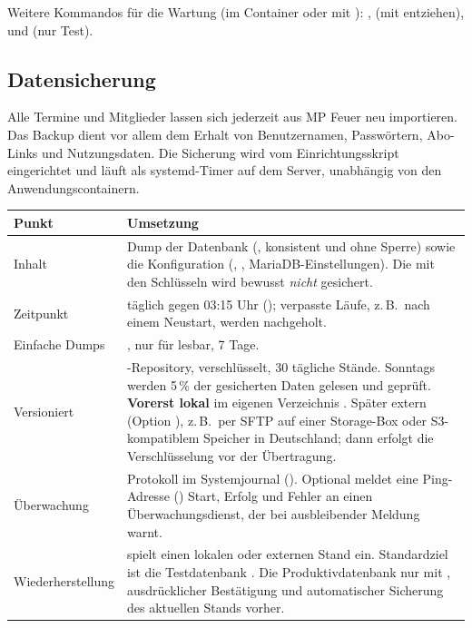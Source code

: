 Weitere Kommandos für die Wartung (im Container  oder
 mit ):
,  (mit 
entziehen),  und  (nur Test).

\subsection{Datensicherung}

Alle Termine und Mitglieder lassen sich jederzeit aus MP Feuer neu
importieren. Das Backup dient vor allem dem Erhalt von Benutzernamen,
Passwörtern, Abo-Links und Nutzungsdaten. Die Sicherung wird vom
Einrichtungsskript  eingerichtet und läuft
als systemd-Timer auf dem Server, unabhängig von den Anwendungscontainern.

\begin{center}
\begin{tabularx}{\textwidth}{L{3.2cm}X}
\toprule
\textbf{Punkt} & \textbf{Umsetzung} \\
\midrule
Inhalt & Dump der Datenbank  (, konsistent und ohne Sperre) sowie die
  Konfiguration (, ,
  MariaDB-Einstellungen). Die  mit den Schlüsseln wird
  bewusst \emph{nicht} gesichert. \\
\addlinespace
Zeitpunkt & täglich gegen 03:15 Uhr ();
  verpasste Läufe, z.\,B.\ nach einem Neustart, werden nachgeholt. \\
\addlinespace
Einfache Dumps & , nur für 
  lesbar, 7 Tage. \\
\addlinespace
Versioniert & -Repository, verschlüsselt, 30 tägliche Stände.
  Sonntags werden 5\,\% der gesicherten Daten gelesen und geprüft.
  \textbf{Vorerst lokal} im eigenen Verzeichnis
  . Später extern (Option ),
  z.\,B.\ per SFTP auf einer Storage-Box oder S3-kompatiblem Speicher in
  Deutschland; dann erfolgt die Verschlüsselung vor der Übertragung. \\
\addlinespace
Überwachung & Protokoll im Systemjournal (). Optional meldet eine Ping-Adresse
  () Start, Erfolg und Fehler an einen
  Überwachungsdienst, der bei ausbleibender Meldung warnt. \\
\addlinespace
Wiederherstellung &  spielt einen lokalen oder
  externen Stand ein. Standardziel ist die Testdatenbank
  . Die Produktivdatenbank nur mit ,
  ausdrücklicher Bestätigung und automatischer Sicherung des aktuellen
  Stands vorher. \\
\bottomrule
\end{tabularx}
\end{center}

